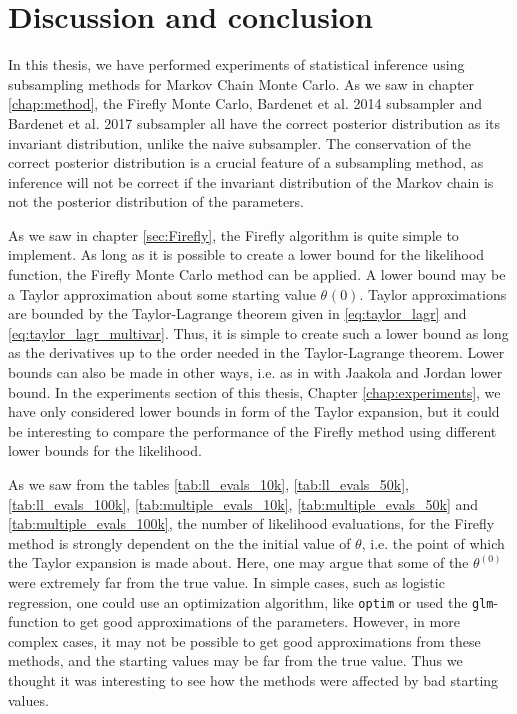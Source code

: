 \chapter{Discussion and conclusion}
In this thesis, we have performed experiments of statistical inference using subsampling methods for Markov Chain Monte Carlo. As we saw in chapter \ref{chap:method}, the Firefly Monte Carlo, Bardenet et al. 2014 subsampler and Bardenet et al. 2017 subsampler all have the correct posterior distribution as its invariant distribution, unlike the naive subsampler. The conservation of the correct posterior distribution is a crucial feature of a subsampling method,  as inference will not be correct if the invariant distribution of the Markov chain is not the posterior distribution of the parameters. 

As we saw in chapter \ref{sec:Firefly}, the Firefly algorithm is quite simple to implement. As long as it is possible to create a lower bound for the likelihood function, the Firefly Monte Carlo method can be applied. A lower bound may be a Taylor approximation about some starting value $\theta^{}\left(0\right)$.  Taylor approximations are bounded by the Taylor-Lagrange theorem given in  \eqref{eq:taylor_lagr} and \eqref{eq:taylor_lagr_multivar}. Thus, it is simple to create such a lower bound as long as the derivatives up to the order needed in the Taylor-Lagrange theorem. Lower bounds can also be made in other ways, i.e. as in  \cite{Maclaurin:1} with Jaakola and Jordan lower bound. In the experiments section of this thesis, Chapter \ref{chap:experiments}, we have only considered lower bounds in form of the Taylor expansion, but it could be interesting to compare the performance of the Firefly method using different lower bounds for the likelihood.

As we saw from the tables \ref{tab:ll_evals_10k}, \ref{tab:ll_evals_50k}, \ref{tab:ll_evals_100k}, \ref{tab:multiple_evals_10k}, \ref{tab:multiple_evals_50k} and \ref{tab:multiple_evals_100k},  the number of  likelihood evaluations, for the Firefly method is strongly dependent on the the initial value of $\theta$, i.e. the point of which the Taylor expansion is made about.
Here, one may argue that some of the $\theta^{\left(0\right)}$ were extremely far from the true value. In simple cases, such as logistic regression, one could use an optimization algorithm, like \texttt{optim} or used the \texttt{glm}-function to get good approximations of the parameters. 
However, in more complex cases, it may not be possible to get good approximations from these methods, and the starting values may be far from the true value. 
Thus we thought it was interesting to see how the methods were affected by bad starting values. 


